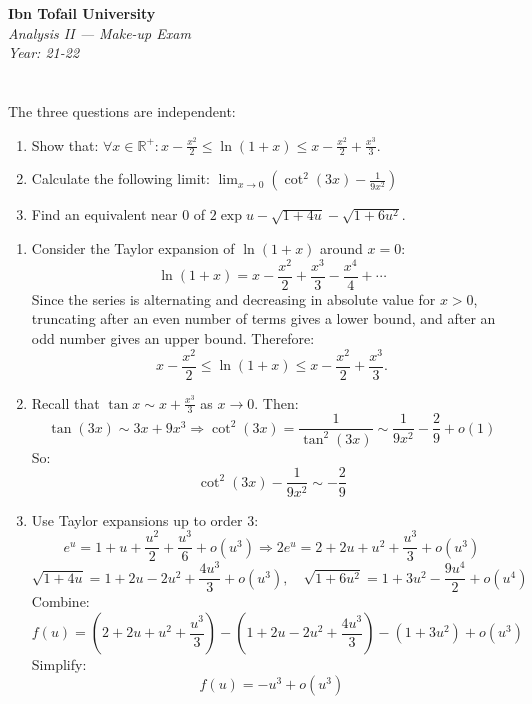 \documentclass[12pt]{article}
\begin{document}
\begin{center}
  \Large\textbf{Ibn Tofail University} \\[1em]
  \large\textit{Analysis II — Make-up Exam} \\[0.5em]
  \large\textit{Year: 21-22} \\[2em]
\end{center}

\vspace{0.5cm}

\section{}
The three questions are independent:
\begin{enumerate}
    \item Show that:
    $\forall x \in \mathbb{R}^+ : x - \frac{x^2}{2} \leq \ln(1 + x) \leq x - \frac{x^2}{2} + \frac{x^3}{3}$.
    
    \item Calculate the following limit:
    $\lim_{x\to 0}\left(\cot^2(3x) - \frac{1}{9x^2}\right)$
    
    \item Find an equivalent near 0 of $2\exp u - \sqrt{1 + 4u} - \sqrt{1 + 6u^2}$.
\end{enumerate}

\newpage

\begin{answerbox}
    \begin{enumerate}
        \item Consider the Taylor expansion of $\ln(1+x)$ around $x = 0$:
        $$
        \ln(1+x) = x - \frac{x^2}{2} + \frac{x^3}{3} - \frac{x^4}{4} + \cdots
        $$
        Since the series is alternating and decreasing in absolute value for $x > 0$, truncating after an even number of terms gives a lower bound, and after an odd number gives an upper bound. Therefore:
        $$
        x - \frac{x^2}{2} \leq \ln(1+x) \leq x - \frac{x^2}{2} + \frac{x^3}{3}.
        $$
    
        
        \item Recall that $\tan x \sim x + \frac{x^3}{3}$ as $x \to 0$. Then:
        $$
        \tan(3x) \sim 3x + 9x^3 \Rightarrow \cot^2(3x) = \frac{1}{\tan^2(3x)} \sim \frac{1}{9x^2} - \frac{2}{9} + o(1)
        $$
        So:
        $$
        \cot^2(3x) - \frac{1}{9x^2} \sim -\frac{2}{9} 
        $$
    
        \item Use Taylor expansions up to order 3:
        $$
        e^u = 1 + u + \frac{u^2}{2} + \frac{u^3}{6} + o(u^3) \Rightarrow 2e^u = 2 + 2u + u^2 + \frac{u^3}{3} + o(u^3)
        $$
        $$
        \sqrt{1 + 4u} = 1 + 2u - 2u^2 + \frac{4u^3}{3} + o(u^3), \quad \sqrt{1 + 6u^2} = 1 + 3u^2 - \frac{9u^4}{2} + o(u^4)
        $$
        Combine:
        $$
        f(u) = (2 + 2u + u^2 + \frac{u^3}{3}) - (1 + 2u - 2u^2 + \frac{4u^3}{3}) - (1 + 3u^2) + o(u^3)
        $$
        Simplify:
        $$
        f(u) = -u^3 + o(u^3)
        $$
    \end{enumerate}
\end{answerbox}
\end{document}
